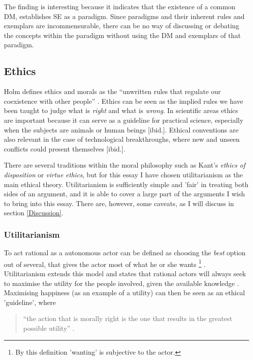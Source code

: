 \documentclass{article}
\begin{document}
The finding is interesting because it indicates that the existence of a common DM, establishes SE as a paradigm. Since paradigms and their inherent rules and exemplars are incommensurable, there can be no way of discussing or debating the concepts within the paradigm without using the DM and exemplars of that paradigm.

\subsection{Ethics}
Holm defines ethics and morals as the ``unwritten rules that regulate our coexistence with other people'' \citep[p.205]{Holm:2014}. Ethics can be seen as the implied rules we have been taught to judge what is \textit{right} and what is \textit{wrong}. In scientific areas ethics are important because it can serve as a guideline for practical science, especially when the subjects are animals or human beings [ibid.]. Ethical conventions are also relevant in the case of technological breakthroughs, where new and unseen conflicts could present themselves [ibid.].

There are several traditions within the moral philosophy such as Kant's \textit{ethics of disposition} or \textit{virtue ethics}, but for this essay I have chosen utilitarianism as the main ethical theory. Utilitarianism is sufficiently simple and 'fair' in treating both sides of an argument, and it is able to cover a large part of the arguments I wish to bring into this essay. There are, however, some caveats, as I will discuss in section \ref{Discussion}.

\subsubsection{Utilitarianism}
To act rational as a autonomous actor can be defined as choosing the \textit{best} option out of several, that gives the actor most of what he or she wants \footnote{By this definition 'wanting' is subjective to the actor.} \citep[p. 232]{Gilje:2007}. Utilitarianism extends this model and states that rational actors will always seek to maximise the utility for the people involved, given the available knowledge \citep[p. 232]{Holm:2014, Gilje:2007}. Maximising happiness (as an example of a utility) can then be seen as an ethical 'guideline', where
\begin{quote}
``the action that is morally right is the one that results in the greatest possible utility'' \citep[p. 207]{Holm:2014}.
\end{quote}
\end{document}
